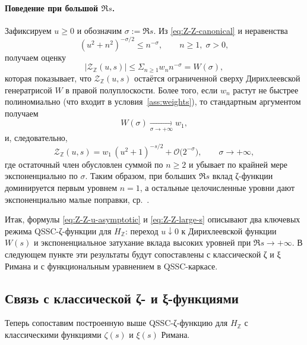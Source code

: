 \documentclass{article}
\numberwithin{equation}{section}
\theoremstyle{plain}
\theoremstyle{definition}
\theoremstyle{remark}
\def\infty{∞}\def\partial{∂}\def\sum{Σ}\def\int{∫}%
\begin{document}
\paragraph{Поведение при большой \texorpdfstring{$\Re s$}{Re s}.}
Зафиксируем $u\ge 0$ и обозначим $\sigma:=\Re s$. Из
\eqref{eq:Z-Z-canonical} и неравенства
\begin{equation}
\label{eq:basic-bound}
(u^2+n^2)^{-\sigma/2}
\le
n^{-\sigma},
\qquad
n\ge 1,\;\sigma>0,
\end{equation}
получаем оценку
\begin{equation}
\label{eq:Z-Z-majorant}
|\mathcal Z_{\mathbb Z}(u,s)|
\le
\sum_{n\ge 1} w_n n^{-\sigma}
=
W(\sigma),
\end{equation}
которая показывает, что $\mathcal Z_{\mathbb Z}(u,s)$ остаётся
ограниченной сверху Дирихлеевской генератрисой $W$ в правой
полуплоскости. Более того, если $w_n$ растут не быстрее полиномиально
(что входит в условия~\ref{ass:weights}), то стандартным аргументом
получаем
\begin{equation}
\label{eq:W-goes-to-zero}
W(\sigma)\xrightarrow[\sigma\to+\infty]{} w_1,
\end{equation}
и, следовательно,
\begin{equation}
\label{eq:Z-Z-large-s}
\mathcal Z_{\mathbb Z}(u,s)
=
w_1\,(u^2+1)^{-s/2}
+
\mathcal O\big(2^{-\sigma}\big),
\qquad
\sigma\to+\infty,
\end{equation}
где остаточный член обусловлен суммой по $n\ge 2$ и убывает
по крайней мере экспоненциально по $\sigma$.
Таким образом, при больших $\Re s$ вклад ζ-функции доминируется
первым уровнем $n=1$, а остальные целочисленные уровни дают
экспоненциально малые поправки, ср.~\cite{Titchmarsh1986}.

\medskip
\noindent
Итак, формулы \eqref{eq:Z-Z-u-asymptotic} и \eqref{eq:Z-Z-large-s}
описывают два ключевых режима QSSC-ζ-функции для $H_{\mathbb Z}$:
переход $u\downarrow 0$ к Дирихлеевской функции $W(s)$ и экспоненциальное
затухание вклада высоких уровней при $\Re s\to+\infty$. В следующем
пункте эти результаты будут сопоставлены с классической ζ и ξ Римана
и с функциональным уравнением в QSSC-каркасе.


\subsection{Связь с классической ζ- и ξ-функциями}
\label{subsec:riemann-link}

\noindent
Теперь сопоставим построенную выше QSSC-ζ-функцию для $H_{\mathbb Z}$
с классическими функциями $\zeta(s)$ и $\xi(s)$ Римана.
\end{document}
